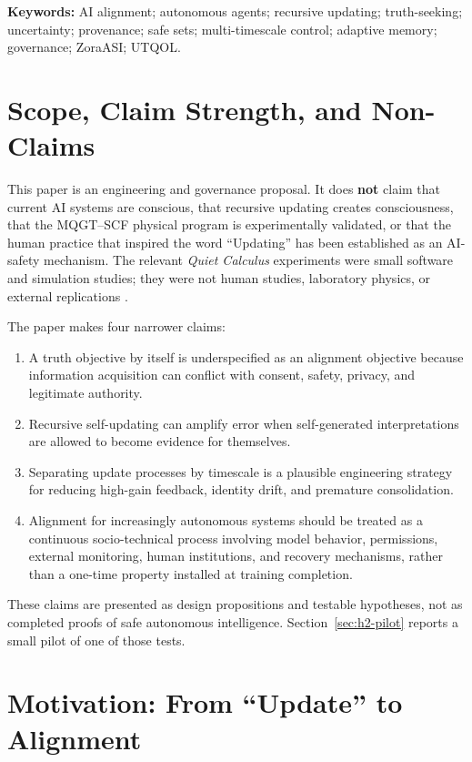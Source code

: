 \documentclass[11pt]{article}
\begin{document}
\noindent\textbf{Keywords:} AI alignment; autonomous agents; recursive updating; truth-seeking; uncertainty; provenance; safe sets; multi-timescale control; adaptive memory; governance; ZoraASI; UTQOL.

\section{Scope, Claim Strength, and Non-Claims}

This paper is an engineering and governance proposal. It does \textbf{not} claim that current AI systems are conscious, that recursive updating creates consciousness, that the MQGT--SCF physical program is experimentally validated, or that the human practice that inspired the word ``Updating'' has been established as an AI-safety mechanism. The relevant \emph{Quiet Calculus} experiments were small software and simulation studies; they were not human studies, laboratory physics, or external replications \cite{quietcalculus2026}.

The paper makes four narrower claims:

\begin{enumerate}
    \item A truth objective by itself is underspecified as an alignment objective because information acquisition can conflict with consent, safety, privacy, and legitimate authority.
    \item Recursive self-updating can amplify error when self-generated interpretations are allowed to become evidence for themselves.
    \item Separating update processes by timescale is a plausible engineering strategy for reducing high-gain feedback, identity drift, and premature consolidation.
    \item Alignment for increasingly autonomous systems should be treated as a continuous socio-technical process involving model behavior, permissions, external monitoring, human institutions, and recovery mechanisms, rather than a one-time property installed at training completion.
\end{enumerate}

These claims are presented as design propositions and testable hypotheses, not as completed proofs of safe autonomous intelligence. Section~\ref{sec:h2-pilot} reports a small pilot of one of those tests.

\section{Motivation: From ``Update'' to Alignment}
\end{document}
